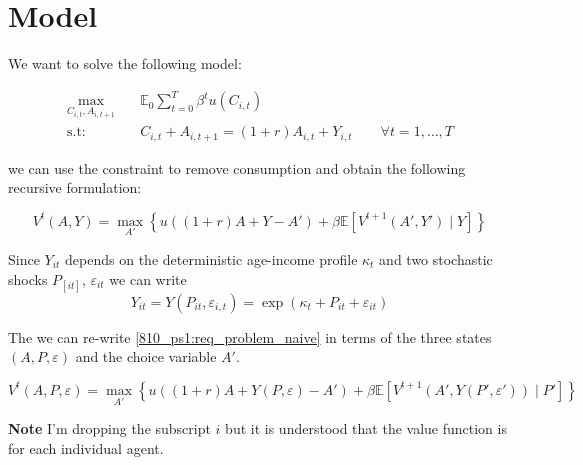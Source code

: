 \documentclass[12pt]{article}
\begin{document}
\section{Model}
We want to solve the following model:

\begin{align*}\label{810_ps1:seq_problem}
\max_{C_{i,t}, A_{i,t+1}} \quad &\mathbb{E}_0 \sum_{t = 0}^{T}\beta^{t}u(C_{i,t})\\
\text{s.t:} \quad & C_{i,t} + A_{i,t+1} = (1+r)A_{i,t}+Y_{i,t} \qquad \forall t=1,\ldots,T
\end{align*}

we can use the constraint to remove consumption and obtain the following recursive formulation:

\begin{equation}\label{810_ps1:req_problem_naive}
    V^t(A, Y) = \max_{A'}\left\{u\left( (1+r)A+Y - A'\right) + \beta \mathbb{E}\left[ V^{t+1}(A', Y') \mid Y \right] \right\}
\end{equation}

Since $Y_{it}$ depends on the deterministic age-income profile $\kappa_t$ and two stochastic shocks $P_[it]$, $\varepsilon_{it}$ we can write $$Y_{it} = Y(P_{it}, \varepsilon_{i,t}) = \exp{(\kappa_t + P_{it} + \varepsilon_{it})}$$

The we can re-write \eqref{810_ps1:req_problem_naive} in terms of the three states $(A, P, \varepsilon)$ and the choice variable $A'$.

\begin{equation}\label{810_ps1:req_problem}
     V^t(A, P, \varepsilon) = \max_{A'}\left\{u\left( (1+r)A+ Y(P, \varepsilon) - A'\right) + \beta \mathbb{E}\left[ V^{t+1}(A', Y(P', \varepsilon')) \mid P' \right] \right\}
\end{equation}

\textbf{Note} I'm dropping the subscript $i$ but it is understood that the value function is for each individual agent.





\end{document}
